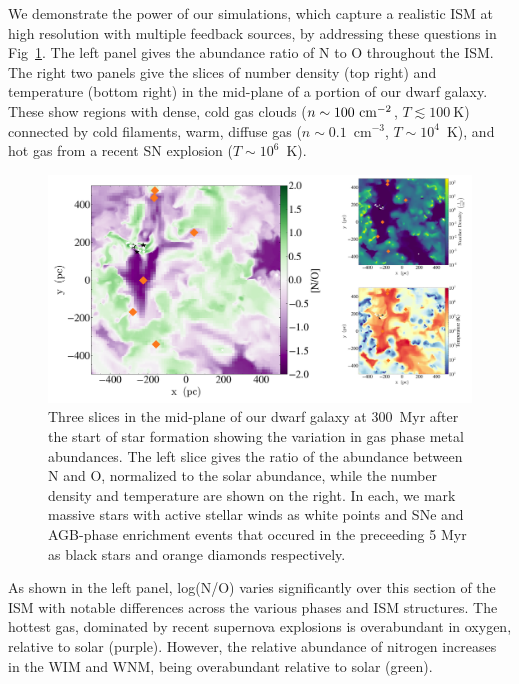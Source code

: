 \documentclass[fleqn,usenatbib,useAMS]{mnras}
\begin{document}
We demonstrate the power of our simulations, which capture a realistic ISM at high resolution with multiple feedback sources, by addressing these questions in Fig~\ref{fig:metal_slices}. The left panel gives the abundance ratio of N to O throughout the ISM. The right 
two panels give the slices of number density (top right) and temperature (bottom right) in the mid-plane of a portion of our dwarf galaxy. These show regions with dense, cold gas clouds ($n \sim 100~\rm{cm}^{-2}$, $T \lesssim 100~$K) connected by cold filaments, warm, diffuse gas ($n\sim 0.1$~cm$^{-3}$, $T\sim 10^{4}$~K), and hot gas from a recent SN explosion ($T\sim10^{6}$~K). 


\begin{figure}
\includegraphics[width=0.98\linewidth]{log_NO_panel}
            \caption{Three slices in the mid-plane of our dwarf galaxy at 300~Myr after the start of star formation showing the variation in gas phase metal abundances. The left slice gives the ratio of the abundance between N and O, normalized to the solar abundance, while the number density and temperature are shown on the right. In each, we mark massive stars with active stellar winds as white points and SNe and AGB-phase enrichment events that occured in the preceeding 5 Myr as black stars and orange diamonds respectively.}
\label{fig:metal_slices}
\end{figure}

As shown in the left panel, log(N/O) varies significantly over this section of the ISM with notable differences across the various phases and ISM structures. The hottest gas, dominated by recent supernova explosions is overabundant in oxygen, relative to solar (purple). However, the relative abundance of nitrogen increases in the WIM and WNM, being overabundant relative to solar (green). 
\end{document}
